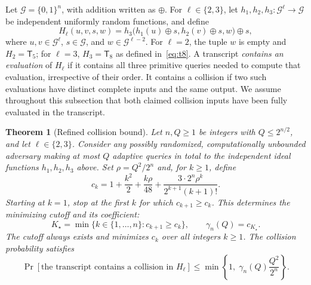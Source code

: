 \documentclass[11pt,letterpaper]{article}
\newtheorem{theorem}{Theorem}[section]
\theoremstyle{definition} %
\newcommand{\Tate}{\mathsf{T}_{8}}
\begin{document}
Let $\mathcal{G}=\{0,1\}^n$, with addition written as $\oplus$.
For $\ell\in\{2,3\}$, let $h_1,h_2,h_3:\mathcal{G}^{\ell}\to
\mathcal{G}$ be independent uniformly random functions, and define
\begin{equation}
 H_{\ell}(u,v,s,w)
 =h_3\bigl(h_1(u)\oplus s,h_2(v)\oplus s,w\bigr)\oplus s,
 \label{eq:generalized-t5}
\end{equation}
where $u,v\in\mathcal{G}^{\ell}$, $s\in\mathcal{G}$, and
$w\in\mathcal{G}^{\ell-2}$. For $\ell=2$, the tuple $w$ is empty
and $H_2=\mathsf{T}_5$; for $\ell=3$, $H_3=\Tate$ as defined
in~\eqref{eq:t8}. A transcript \emph{contains an evaluation} of
$H_{\ell}$ if it contains all three primitive queries needed to compute
that evaluation, irrespective of their order. It contains a collision if
two such evaluations have distinct complete inputs and the same output.
We assume throughout this subsection that both claimed collision inputs
have been fully evaluated in the transcript.

\begin{theorem}[Refined collision bound]
\label{thm:refined-collision}
Let $n,Q\geq1$ be integers with $Q\leq2^{n/2}$, and let
$\ell\in\{2,3\}$. Consider any
possibly randomized, computationally unbounded adversary making at most
$Q$ adaptive queries in total to the independent ideal functions
$h_1,h_2,h_3$ above. Set $\rho=Q^2/2^n$ and, for $k\geq1$, define
\begin{equation}
 c_k
 =1+\frac{k^2}{2}+\frac{k\rho}{48}
   +\frac{3\cdot2^n\rho^k}{2^{k+1}(k+1)!}.
 \label{eq:collision-coefficient}
\end{equation}
Starting at $k=1$, stop at the first $k$ for which $c_{k+1}\geq c_k$.
This determines the minimizing cutoff and its coefficient:
\[
 K_\star=\min\{k\in\{1,\ldots,n\}:c_{k+1}\geq c_k\},
 \qquad \gamma_n(Q)=c_{K_\star}.
\]
The cutoff always exists and minimizes $c_k$ over all integers $k\geq1$.
The collision probability satisfies
\begin{equation}
 \Pr[\text{the transcript contains a collision in $H_\ell$}]
 \leq\min\left\{1,\;\gamma_n(Q)\frac{Q^2}{2^n}\right\}.
 \label{eq:refined-collision-bound}
\end{equation}
\end{theorem}
\end{document}
